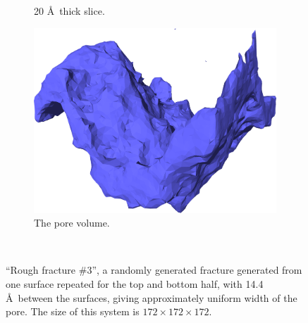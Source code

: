 \begin{figure}[!p]
{\begin{subfigure}[t]{\myfigwidth}
            \caption{20 \AA\ thick slice.}%
        \end{subfigure}%
        \hspace{\myhfillwidth}%
        \begin{subfigure}[t]{\myfigwidth}%
            \centering%
            \includegraphics[width=\textwidth]{images/systems/trimmed-rough_fracture04_11}%
            \caption{The pore volume.}%
        \end{subfigure}%
    }%
    \vspace{10pt}\\%
    \caption{%
        ``Rough fracture \#3'', a randomly generated fracture generated from one surface repeated for the top and bottom half, with 14.4 \AA\ between the surfaces, giving approximately uniform width of the pore. The size of this system is $172 \times 172 \times 172$.%
        \label{fig:renderings_rough_fracture04_same_distance}%
    }%
\end{figure}%


